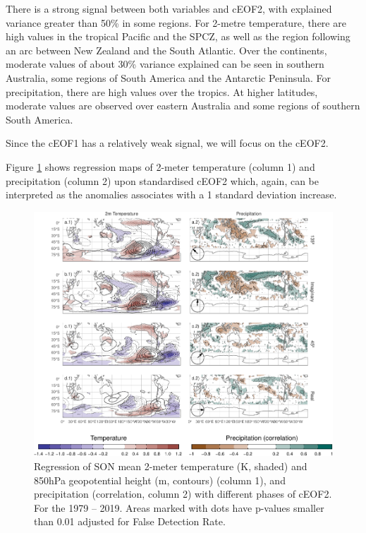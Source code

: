 \documentclass[smallextended]{svjour3}       %
\begin{document}
There is a strong signal between both variables and cEOF2, with explained variance greater than 50\% in some regions.
For 2-metre temperature, there are high values in the tropical Pacific and the SPCZ, as well as the region following an arc between New Zealand and the South Atlantic.
Over the continents, moderate values of about 30\% variance explained can be seen in southern Australia, some regions of South America and the Antarctic Peninsula.
For precipitation, there are high values over the tropics.
At higher latitudes, moderate values are observed over eastern Australia and some regions of southern South America.

Since the cEOF1 has a relatively weak signal, we will focus on the cEOF2.

Figure \ref{fig:pp-temp-2} shows regression maps of 2-meter temperature (column 1) and precipitation (column 2) upon standardised cEOF2 which, again, can be interpreted as the anomalies associates with a 1 standard deviation increase.



\begin{figure}
\centering
\includegraphics{../figures/pp-temp-2-1.pdf}
\caption{\label{fig:pp-temp-2}Regression of SON mean 2-meter temperature (K, shaded) and 850hPa geopotential height (m, contours) (column 1), and precipitation (correlation, column 2) with different phases of cEOF2. For the 1979 -- 2019. Areas marked with dots have p-values smaller than 0.01 adjusted for False Detection Rate.}
\end{figure}
\end{document}
